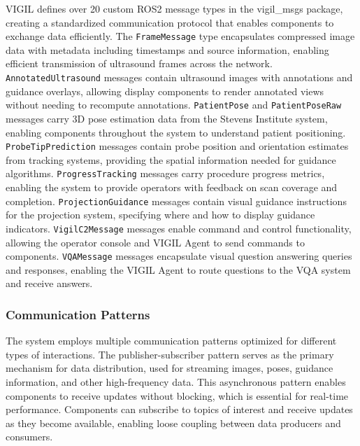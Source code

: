 \documentclass[12pt,a4paper]{article}
\begin{document}
VIGIL defines over 20 custom ROS2 message types in the vigil\_msgs package, creating a standardized communication protocol that enables components to exchange data efficiently. The \texttt{FrameMessage} type encapsulates compressed image data with metadata including timestamps and source information, enabling efficient transmission of ultrasound frames across the network. \texttt{AnnotatedUltrasound} messages contain ultrasound images with annotations and guidance overlays, allowing display components to render annotated views without needing to recompute annotations. \texttt{PatientPose} and \texttt{PatientPoseRaw} messages carry 3D pose estimation data from the Stevens Institute system, enabling components throughout the system to understand patient positioning. \texttt{ProbeTipPrediction} messages contain probe position and orientation estimates from tracking systems, providing the spatial information needed for guidance algorithms. \texttt{ProgressTracking} messages carry procedure progress metrics, enabling the system to provide operators with feedback on scan coverage and completion. \texttt{ProjectionGuidance} messages contain visual guidance instructions for the projection system, specifying where and how to display guidance indicators. \texttt{VigilC2Message} messages enable command and control functionality, allowing the operator console and VIGIL Agent to send commands to components. \texttt{VQAMessage} messages encapsulate visual question answering queries and responses, enabling the VIGIL Agent to route questions to the VQA system and receive answers.

\subsubsection{Communication Patterns}

The system employs multiple communication patterns optimized for different types of interactions. The publisher-subscriber pattern serves as the primary mechanism for data distribution, used for streaming images, poses, guidance information, and other high-frequency data. This asynchronous pattern enables components to receive updates without blocking, which is essential for real-time performance. Components can subscribe to topics of interest and receive updates as they become available, enabling loose coupling between data producers and consumers.
\end{document}
